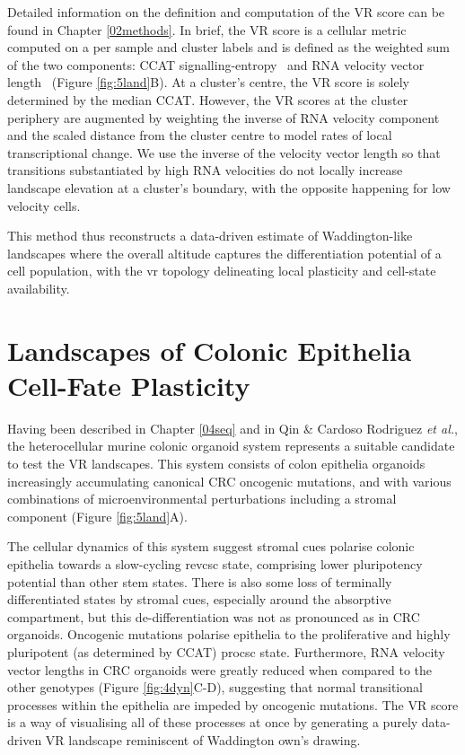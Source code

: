 Detailed information on the definition and computation of the VR score can be found in Chapter \ref{02methods}. In brief, the VR score is a cellular metric computed on a per sample and cluster labels and is defined as the weighted sum of the two components: CCAT signalling-entropy~\cite{teschendorff_single-cell_2017} and RNA velocity vector length~\cite{bergen_generalizing_2020} (Figure \ref{fig:5land}B). 
At a cluster's centre, the VR score is solely determined by the median CCAT. However, the VR scores at the cluster periphery are augmented by weighting the inverse of RNA velocity component and the scaled distance from the cluster centre to model rates of local transcriptional change. We use the inverse of the velocity vector length so that transitions substantiated by high RNA velocities do not locally increase landscape elevation at a cluster's boundary, with the opposite happening for low velocity cells.

This method thus reconstructs a data-driven estimate of Waddington-like landscapes where the overall altitude captures the differentiation potential of a cell population, with the \acrlong{vr} topology delineating local plasticity and cell-state availability. 

\newpage
\section{Landscapes of Colonic Epithelia Cell-Fate Plasticity}

Having been described in Chapter \ref{04seq} and in Qin \& Cardoso Rodriguez \emph{et al.}, the heterocellular murine colonic organoid system represents a suitable candidate to test the VR landscapes. 
This system consists of colon epithelia organoids increasingly accumulating canonical CRC oncogenic mutations, and with various combinations of microenvironmental perturbations including a stromal component (Figure \ref{fig:5land}A).

The cellular dynamics of this system suggest stromal cues polarise colonic epithelia towards a slow-cycling \acrshort{revcsc} state, comprising lower pluripotency potential than other stem states. There is also some loss of terminally differentiated states by stromal cues, especially around the absorptive compartment, but this de-differentiation was not as pronounced as in CRC organoids.
Oncogenic mutations polarise epithelia to the proliferative and highly pluripotent (as determined by CCAT) \acrshort{procsc} state. Furthermore, RNA velocity vector lengths in CRC organoids were greatly reduced when compared to the other genotypes (Figure \ref{fig:4dyn}C-D), suggesting that normal transitional processes within the epithelia are impeded by oncogenic mutations.
The VR score is a way of visualising all of these processes at once by generating a purely data-driven VR landscape reminiscent of Waddington own's drawing.

